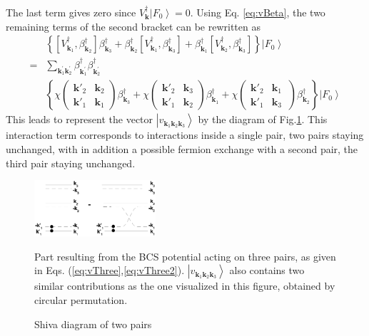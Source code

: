 \documentclass[aps,prb,superscriptaddress,twocolumn]{revtex4}
\newcommand{\vk}{\ensuremath{\mathbf{k}}}
\begin{document}
The last term gives zero since $V^{\dagger}_\vk\left|F_0\right>  =0$. Using
Eq. \eqref{eq:vBeta}, the two remaining terms of the second bracket can be
rewritten as 
\begin{equation}  \label{eq:vThree2}
\begin{split}
&\left\{\left[V^{\dagger}_{\mathbf{k} _1},\beta^{\dagger}_{\mathbf{k} _2}%
\right]  \beta^{\dagger}_{\mathbf{k} _3}+\beta^{\dagger}_{\mathbf{k} _2}%
\left[V^{\dagger}_{\mathbf{k} _1},\beta^{\dagger}_{\mathbf{k} _3}\right] 
+\beta^{\dagger}_{\mathbf{k} _1}\left[V^{\dagger}_{\mathbf{k}
_2},\beta^{\dagger}_{\mathbf{k} _3}\right]  \right\} \left|F_0\right>   \\
=&\sum_{\vk^{\prime}_1\mathbf{k} ^{\prime}_2}\beta^{\dagger}_{\mathbf{k}
^{\prime}_1}\beta^{\dagger}_{\mathbf{k} ^{\prime}_2} \\
&\left\{\chi\left(\begin{smallmatrix}\vk'_2&\vk_2\\\vk'_1&\vk_1%
\end{smallmatrix}\right)  \beta^{\dagger}_{\mathbf{k} _3}+\chi\left(%
\begin{smallmatrix}\vk'_2&\vk_3\\\vk'_1&\vk_2\end{smallmatrix}\right) 
\beta^{\dagger}_{\mathbf{k} _1}+\chi\left(\begin{smallmatrix}\vk'_2&\vk_1\
\\\vk'_1&\vk_3\end{smallmatrix}\right)  \beta^{\dagger}_{\mathbf{k}
_2}\right\} \left|F_0\right>  
\end{split}%
\end{equation}
This leads to represent the vector $\left|v_{\mathbf{k} _1\mathbf{k} _2%
\mathbf{k} _3}\right> $ by the diagram of Fig.\ref{fig:threeP}. This
interaction term corresponds to interactions inside a single pair, two pairs
staying unchanged, with in addition a possible fermion exchange with a
second pair, the third pair staying unchanged. 
\begin{figure}[htb]
\caption{Shiva diagram of two pairs }
\label{fig:threeP}
   \includegraphics[width=0.4\textwidth]{threePair.eps}

Part resulting from the BCS potential acting on three pairs, as given in
Eqs. (\ref{eq:vThree},\ref{eq:vThree2}). $\left|v_{\mathbf{k} _1\mathbf{k} _2%
\mathbf{k} _3}\right> $ also contains two similar contributions as the one
visualized in this figure, obtained by circular permutation.
\end{figure}
\end{document}
